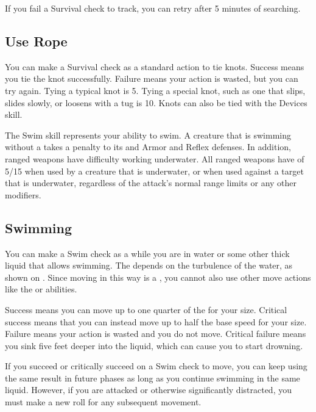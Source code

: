         If you fail a Survival check to track, you can retry after 5 minutes of searching.

    \subsection{Use Rope}
        You can make a Survival check as a standard action to tie knots. Success means you tie the knot successfully. Failure means your action is wasted, but you can try again. Tying a typical knot is  5. Tying a special knot, such as one that slips, slides slowly, or loosens with a tug is  10. Knots can also be tied with the Devices skill.

\newpage
{}
        The Swim skill represents your ability to swim.
        A creature that is swimming without a  takes a  penalty to its  and Armor and Reflex defenses.
        In addition, ranged weapons have difficulty working underwater.
        All ranged weapons have  of 5/15 when used by a creature that is underwater, or when used against a target that is underwater, regardless of the attack's normal range limits or any other modifiers.

    \subsection{Swimming}
        You can make a Swim check as a  while you are in water or some other thick liquid that allows swimming.
        The  depends on the turbulence of the water, as shown on .
        Since moving in this way is a , you cannot also use other move actions like the  or  abilities.

        Success means you can move up to one quarter of the  for your size.
        Critical success means that you can instead move up to half the base speed for your size.
        Failure means your action is wasted and you do not move.
        Critical failure means you sink five feet deeper into the liquid, which can cause you to start drowning.

        If you succeed or critically succeed on a Swim check to move, you can keep using the same result in future phases as long as you continue swimming in the same liquid.
        However, if you are attacked or otherwise significantly distracted, you must make a new roll for any subsequent movement.

